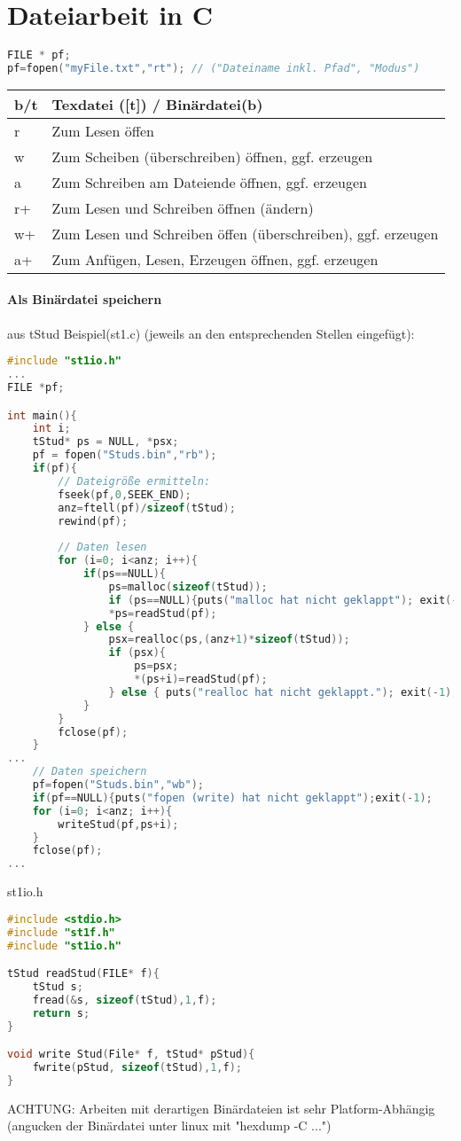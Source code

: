 \section{Dateiarbeit in C}
\begin{lstlisting}[language=C]
FILE * pf;
pf=fopen("myFile.txt","rt"); // ("Dateiname inkl. Pfad", "Modus")
\end{lstlisting}
\begin{tabular}{l | l}
b/t& Texdatei ([t]) / Binärdatei(b)\\
\hline 
r&Zum Lesen öffen\\
w&Zum Scheiben (überschreiben) öffnen, ggf. erzeugen\\
a&Zum Schreiben am Dateiende öffnen, ggf. erzeugen\\
r+&Zum Lesen und Schreiben öffnen (ändern)\\
w+&Zum Lesen und Schreiben öffen (überschreiben), ggf. erzeugen\\
a+&Zum Anfügen, Lesen, Erzeugen öffnen, ggf. erzeugen\\
\end{tabular}
\paragraph{Als Binärdatei speichern}
aus tStud Beispiel(st1.c) (jeweils an den entsprechenden Stellen eingefügt):
\begin{lstlisting}[language=C]
#include "st1io.h"
...
FILE *pf;

int main(){
	int i;
	tStud* ps = NULL, *psx;
	pf = fopen("Studs.bin","rb");
	if(pf){
		// Dateigröße ermitteln:
		fseek(pf,0,SEEK_END);
		anz=ftell(pf)/sizeof(tStud);
		rewind(pf);
		
		// Daten lesen
		for (i=0; i<anz; i++){
			if(ps==NULL){
				ps=malloc(sizeof(tStud));
				if (ps==NULL){puts("malloc hat nicht geklappt"); exit(-1);}
				*ps=readStud(pf);
			} else {	
				psx=realloc(ps,(anz+1)*sizeof(tStud));
				if (psx){
					ps=psx;
					*(ps+i)=readStud(pf);
				} else { puts("realloc hat nicht geklappt."); exit(-1);}
			}
		}
		fclose(pf);
	}
...
	// Daten speichern
	pf=fopen("Studs.bin","wb");
	if(pf==NULL){puts("fopen (write) hat nicht geklappt");exit(-1);
	for (i=0; i<anz; i++){
		writeStud(pf,ps+i);
	}
	fclose(pf);
...
\end{lstlisting}

st1io.h
\begin{lstlisting}[language=C]
#include <stdio.h>
#include "st1f.h"
#include "st1io.h"

tStud readStud(FILE* f){
	tStud s;
	fread(&s, sizeof(tStud),1,f);
	return s;
}

void write Stud(File* f, tStud* pStud){
	fwrite(pStud, sizeof(tStud),1,f);
}
\end{lstlisting}
ACHTUNG: Arbeiten mit derartigen Binärdateien ist sehr Platform-Abhängig (angucken der Binärdatei unter linux mit "hexdump -C ...")

